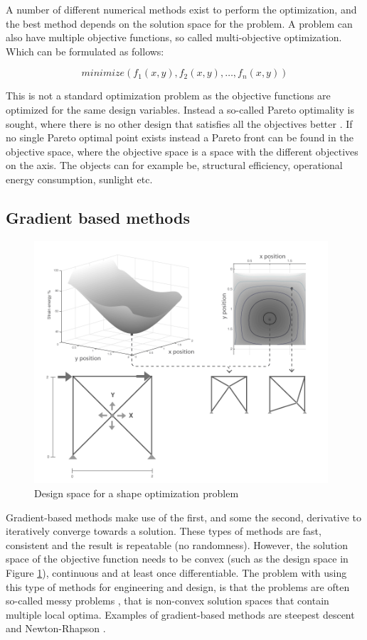  A number of different numerical methods exist to perform the optimization, and the best method depends on the solution space for the problem. A problem can also have multiple objective functions, so called multi-objective optimization. Which can be formulated as follows:

\begin{equation*}
minimize(f_1(x,y),f_2(x,y), \dotsc, f_n(x,y))
\end{equation*}

This is not a standard optimization problem as the objective functions are optimized for the same design variables. Instead a so-called Pareto optimality is sought, where there is no other design that satisfies all the objectives better \cite{christensen2008introduction}. If no single Pareto optimal point exists instead a Pareto front can be found in the objective space, where the objective space is a space with the different objectives on the axis. The objects can for example be, structural efficiency, operational energy consumption, sunlight etc.

\subsection{Gradient based methods}
\begin{figure}
  \includegraphics[width=310pt]{graphics/designspace.png}
  \caption{Design space for a shape optimization problem}
  \label{fig:designspace}
\end{figure}

Gradient-based methods make use of the first, and some the second, derivative to iteratively converge towards a solution. These types of methods are fast, consistent and the result is repeatable (no randomness). However, the solution space of the objective function needs to be convex (such as the design space in Figure \ref{fig:designspace}), continuous and at least once differentiable. The problem with using this type of methods for engineering and design, is that the problems are often so-called messy problems \cite{schlaich2006challenges}, that is non-convex solution spaces that contain multiple local optima. Examples of gradient-based methods are steepest descent and Newton-Rhapson \cite{christensen2008introduction}. 

